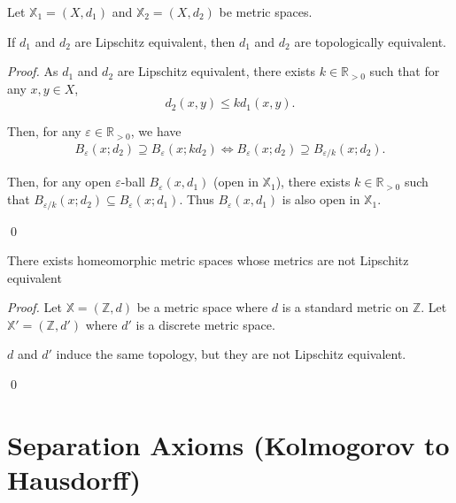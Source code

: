 \begin{proposition}
	Let $\mathbb X_1 = (X, d_1)$ and $\mathbb X_2 = (X, d_2)$ be metric spaces.
	
	If $d_1$ and $d_2$ are Lipschitz equivalent, then $d_1$ and $d_2$ are topologically equivalent.
	
	\begin{proof}
		As $d_1$ and $d_2$ are Lipschitz equivalent, there exists $k \in \mathbb R_{> 0}$ such that for any $x,y \in X$,
		$$
		d_2 (x,y) \le k d_1 (x,y).
		$$
		
		Then, for any $\varepsilon \in \mathbb R_{> 0}$, we have
		$$
		\begin{aligned}
			B_\varepsilon (x; d_2) \supseteq B_{\varepsilon} (x; kd_2)
			\iff B_\varepsilon (x; d_2) \supseteq B_{\varepsilon / k} (x; d_2).
		\end{aligned}
		$$
		
		Then, for any open $\varepsilon$-ball $B_\varepsilon (x, d_1)$ (open in $\mathbb X_1$), there exists $k \in \mathbb R_{> 0}$ such that $B_{\varepsilon/k} (x; d_2) \subseteq B_\varepsilon (x;d_1)$. Thus $B_\varepsilon (x, d_1)$ is also open in $\mathbb X_1$.
		
		\qed
	\end{proof}
\end{proposition}


\begin{proposition}
	There exists homeomorphic metric spaces whose metrics are not Lipschitz equivalent
	
	\begin{proof}
		Let $\mathbb X = (\mathbb Z, d)$ be a metric space where $d$ is a standard metric on $\mathbb Z$. Let $\mathbb X' = (\mathbb Z, d')$ where $d'$ is a discrete metric space.
		
		$d$ and $d'$ induce the same topology, but they are not Lipschitz equivalent.
		
		\qed
	\end{proof}
\end{proposition}





\chapter{Separation Axioms (Kolmogorov to Hausdorff)}


